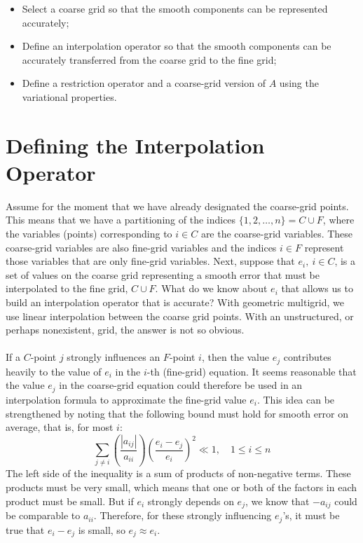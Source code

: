 \documentclass[11pt]{book}
\begin{document}
\begin{itemize}

 \item  Select a coarse grid so that the smooth components can be represented accurately;
 
  \item Define an interpolation operator so that the smooth components can be accurately transferred from the coarse grid to the fine grid; 

  \item Define a restriction operator and a coarse-grid version of $A$ using the variational properties.

\end{itemize}

\section*{Defining the Interpolation Operator}
Assume for the moment that we have already designated the coarse-grid points. This means that we have a partitioning of the indices $\{1,2, \ldots, n\}=C \cup F$, where the variables (points) corresponding to $i \in C$ are the coarse-grid variables. These coarse-grid variables are also fine-grid variables and the indices $i \in F$ represent those variables that are only fine-grid variables. Next, suppose that $e_{i}, \ i \in C$, is a set of values on the coarse grid representing a smooth error that must be interpolated to the fine grid, $C \cup F$. What do we know about $e_{i}$ that allows us to build an interpolation operator that is accurate? With geometric multigrid, we use linear interpolation between the coarse grid points. With an unstructured, or perhaps nonexistent, grid, the answer is not so obvious. \\ \\
If a $C$-point $j$ strongly influences an $F$-point $i$, then the value $e_{j}$ contributes heavily to the value of $e_{i}$ in the $i$-th (fine-grid) equation. It seems reasonable that the value $e_{j}$ in the coarse-grid equation could therefore be used in an interpolation formula to approximate the fine-grid value $e_{i}$. This idea can be strengthened by noting that the following bound must hold for smooth error on average, that is, for most $i$:
$$
\sum_{j \neq i}\left(\frac{\left|a_{i j}\right|}{a_{i i}}\right)\left(\frac{e_{i}-e_{j}}{e_{i}}\right)^{2} \ll 1, \quad 1 \leq i \leq n
$$
The left side of the inequality is a sum of products of non-negative terms. These products must be very small, which means that one or both of the factors in each product must be small. But if $e_{i}$ strongly depends on $e_{j}$, we know that $-a_{i j}$ could be comparable to $a_{i i}$. Therefore, for these strongly influencing $e_{j}$'s, it must be true that $e_{i}-e_{j}$ is small, so $e_{j} \approx e_{i}$.\\ \\
\end{document}
